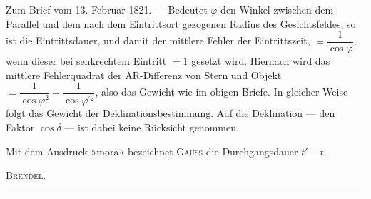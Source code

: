 Zum Brief vom 13. Februar 1821. — Bedeutet $\varphi$ den Winkel zwischen dem Parallel und dem nach dem Eintrittsort gezogenen Radius des Gesichtsfeldes, so ist die Eintrittsdauer, und damit der mittlere Fehler der Eintrittszeit, $=\dfrac{1}{\cos\varphi}$, wenn dieser bei senkrechtem Eintritt $=1$ gesetzt wird. Hiernach wird das mittlere Fehlerquadrat der AR-Differenz von Stern und Objekt $=\dfrac{1}{\cos\varphi^2}+\dfrac{1}{\cos\varphi^{\prime 2}}$, also das Gewicht wie im obigen Briefe. In gleicher Weise folgt das Gewicht der Deklinationsbestimmung. Auf die Deklination — den Faktor $\cos\delta$ — ist dabei keine Rücksicht genommen.

Mit dem Ausdruck »mora« bezeichnet \textsc{Gauss} die Durchgangsdauer $t'-t$.
\begin{flushright}\textsc{Brendel}.\end{flushright}
\begin{center}\rule{.31\textwidth}{.35pt}\end{center}
\clearpage\endgroup\endgroup

